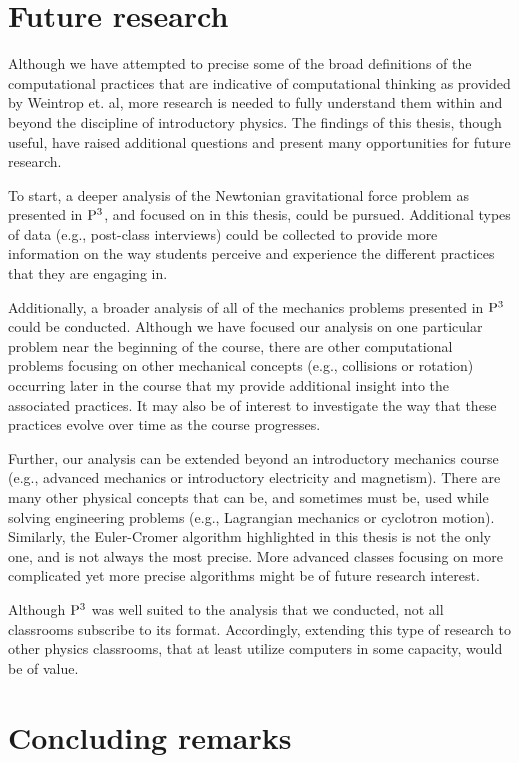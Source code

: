 \documentclass{msuphddissertation}
\begin{document}
\begin{doublespace}
\section{Future research}

Although we have attempted to precise some of the broad definitions of the computational practices that are indicative of computational thinking as provided by Weintrop et. al, more research is needed to fully understand them within and beyond the discipline of introductory physics.  The findings of this thesis, though useful, have raised additional questions and present many opportunities for future research.

To start, a deeper analysis of the Newtonian gravitational force problem as presented in ${\rm P}^{3}$, and focused on in this thesis, could be pursued.  Additional types of data (e.g., post-class interviews) could be collected to provide more information on the way students perceive and experience the different practices that they are engaging in.

Additionally, a broader analysis of all of the mechanics problems presented in ${\rm P}^{3}$ could be conducted.  Although we have focused our analysis on one particular problem near the beginning of the course, there are other computational problems focusing on other mechanical concepts (e.g., collisions or rotation) occurring later in the course that my provide additional insight into the associated practices.  It may also be of interest to investigate the way that these practices evolve over time as the course progresses.

Further, our analysis can be extended beyond an introductory mechanics course (e.g., advanced mechanics or introductory electricity and magnetism).  There are many other physical concepts that can be, and sometimes must be, used while solving engineering problems (e.g., Lagrangian mechanics or cyclotron motion).  Similarly, the Euler-Cromer algorithm highlighted in this thesis is not the only one, and is not always the most precise.  More advanced classes focusing on more complicated yet more precise algorithms might be of future research interest.

Although ${\rm P}^{3}$ was well suited to the analysis that we conducted, not all classrooms subscribe to its format.  Accordingly, extending this type of research to other physics classrooms, that at least utilize computers in some capacity, would be of value.

\section{Concluding remarks}


\end{doublespace}
\end{document}
